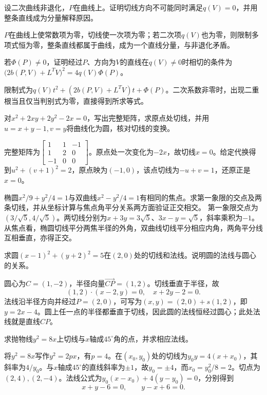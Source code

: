 设二次曲线非退化，\(P\)在曲线上。证明切线方向不可能同时满足\(q(V)=0\)，并用整条直线成为分量解释原因。
\par
\solutionanswer
\(P\)在曲线上使常数项为零，切线使一次项为零；若二次项\(q(V)\)也为零，则限制多项式恒为零，整条直线都属于曲线，成为一个直线分量，与非退化矛盾。


若\(\Phi(P)\ne0\)，证明经过\(P\)、方向为\(V\)的直线在\(q(V)\ne0\)时相切的条件为
\(\bigl(2b(P,V)+L^TV\bigr)^2=4q(V)\Phi(P)\)。
\par
\solutionanswer
限制式为\(q(V)t^2+(2b(P,V)+L^TV)t+\Phi(P)\)。二次系数非零时，出现二重根当且仅当判别式为零，直接得到所求等式。


对\(x^2+2xy+2y^2-2x=0\)，写出完整矩阵，求原点处切线，并用\(u=x+y-1,v=y\)将曲线化为圆，核对切线的变换。
\par
\solutionanswer
完整矩阵为\(\begin{bmatrix}1&1&-1\\1&2&0\\-1&0&0\end{bmatrix}\)。原点处一次变化为\(-2x\)，故切线\(x=0\)。给定代换得到\(u^2+(v+1)^2=2\)，原点映为\((-1,0)\)，该点切线为\(-u+v=1\)，还原正是\(x=0\)。


椭圆\(x^2/9+y^2/4=1\)与双曲线\(x^2-y^2/4=1\)有相同的焦点。求第一象限的交点及两条切线，并从坐标计算与焦点角平分关系两方面验证正交相交。
\solutionanswer
第一象限交点为\((3/\sqrt5,4/\sqrt5)\)。两切线分别为\(x+3y=3\sqrt5\)、\(3x-y=\sqrt5\)，斜率乘积为\(-1\)。从焦点看，椭圆切线平分两焦半径的外角，双曲线切线平分相应内角，两角平分线互相垂直，亦得正交。


求圆\((x-1)^2+(y+2)^2=5\)在\((2,0)\)处的切线和法线。说明圆的法线与圆心的关系。
\par
\solutionanswer
圆心为\(C=(1,-2)\)，半径向量\(\overrightarrow{CP}=(1,2)\)。切线垂直于半径，故
\[(1,2)\cdot(x-2,y)=0,\quad x+2y-2=0.\]
法线沿半径方向并经过\(P=(2,0)\)，可写为\((x,y)=(2,0)+s(1,2)\)，即\(y=2x-4\)。圆上任一点的半径都垂直于切线，因此圆的法线恒经过圆心；此处法线就是直线\(CP\)。


求抛物线\(y^2=8x\)上切线与\(x\)轴成\(45^\circ\)角的点，并求相应法线。
\par
\solutionanswer
将\(y^2=8x\)写作\(y^2=2px\)，有\(p=4\)。在\((x_0,y_0)\)处的切线为\(y_0y=4(x+x_0)\)，其斜率为\(4/y_0\)。与\(x\)轴成\(45^\circ\)的直线斜率为\(\pm1\)，故\(y_0=\pm4\)，而\(x_0=y_0^2/8=2\)。切点为\((2,4),(2,-4)\)。法线公式为\(y_0(x-x_0)+4(y-y_0)=0\)，分别得到
\[x+y-6=0,\qquad y-x+6=0.\]



